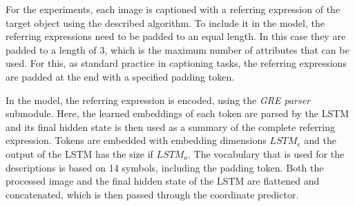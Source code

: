 
For the experiments, each image is captioned with a referring expression of the target object using the described algorithm.
To include it in the model, the referring expressions need to be padded to an equal length.
In this case they are padded to a length of 3, which is the maximum number of attributes that can be used.
For this, as standard practice in captioning tasks, the referring expressions are padded at the end with a specified padding token.

In the model, the referring expression is encoded, using the \emph{GRE parser} submodule.
Here, the learned embeddings of each token are parsed by the LSTM and its final hidden state is then used as a summary of the complete referring expression.
Tokens are embedded with embedding dimensions $LSTM_e$ and the output of the LSTM has the size if $LSTM_o$.
The vocabulary that is used for the descriptions is based on 14 symbols, including the padding token.
Both the processed image and the final hidden state of the LSTM are flattened and concatenated, which is then passed through the coordinate predictor.

